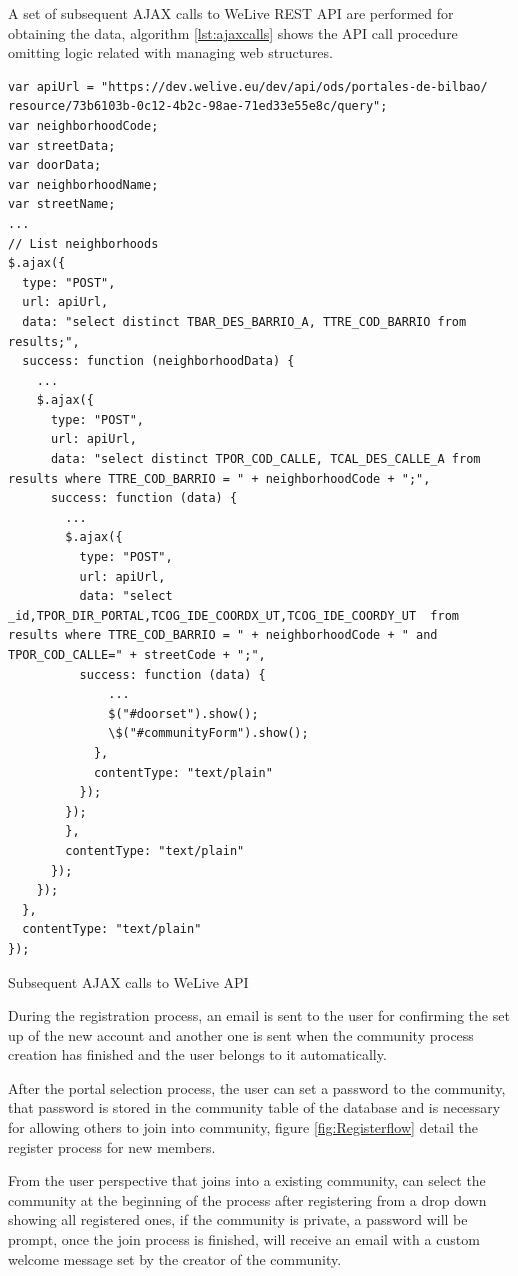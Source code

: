 \documentclass{DeustoFDP}
\begin{document}
A set of subsequent AJAX calls to WeLive REST API are performed for obtaining the data, algorithm \ref{lst:ajaxcalls} shows the API call procedure omitting logic related with managing web structures.

\begin{listing}[!h]\centering 
	\begin{minipage}{.9\textwidth}
		\begin{verbatim}
var apiUrl = "https://dev.welive.eu/dev/api/ods/portales-de-bilbao/
resource/73b6103b-0c12-4b2c-98ae-71ed33e55e8c/query";
var neighborhoodCode;
var streetData;
var doorData;
var neighborhoodName;
var streetName;
...
// List neighborhoods
$.ajax({
  type: "POST",
  url: apiUrl,
  data: "select distinct TBAR_DES_BARRIO_A, TTRE_COD_BARRIO from results;",
  success: function (neighborhoodData) {
    ...
    $.ajax({
      type: "POST",
      url: apiUrl,
      data: "select distinct TPOR_COD_CALLE, TCAL_DES_CALLE_A from results where TTRE_COD_BARRIO = " + neighborhoodCode + ";",
      success: function (data) {
        ...
        $.ajax({
          type: "POST",
          url: apiUrl,
          data: "select _id,TPOR_DIR_PORTAL,TCOG_IDE_COORDX_UT,TCOG_IDE_COORDY_UT  from results where TTRE_COD_BARRIO = " + neighborhoodCode + " and TPOR_COD_CALLE=" + streetCode + ";",
          success: function (data) {
              ...
              $("#doorset").show();
              \$("#communityForm").show();
            },
            contentType: "text/plain"
          });
        });
        },
        contentType: "text/plain"
      });
    });
  },
  contentType: "text/plain"
});
		\end{verbatim}
	\end{minipage}
	\caption{Subsequent AJAX calls to WeLive API }\label{lst:ajaxcalls}
\end{listing}

During the registration process, an email is sent to the user for confirming the set up of the new account and another one is sent when the community process creation has finished and the user belongs to it automatically.

After the portal selection process, the user can set a password to the community, that password is stored in the community table of the database and is necessary for allowing others to join into community, figure \ref{fig:Registerflow} detail the register process for new members.

From the user perspective that joins into a existing community, can select the community at the beginning of the process after registering from a drop down showing all registered ones, if the community is private, a password will be prompt, once the join process is finished, will receive an email with a custom welcome message set by the creator of the community.
\end{document}
